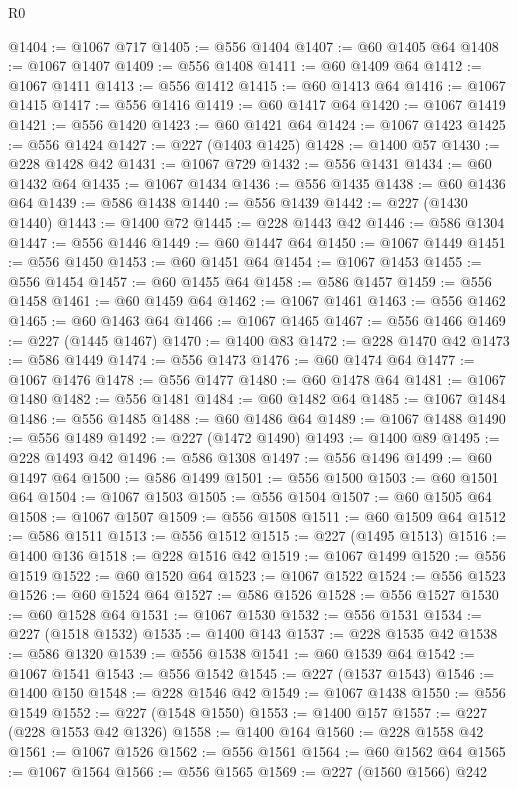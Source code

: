 \begin{lexlean}{R0}
\begin{coremodule}
@1404 := @1067 @717
@1405 := @556 @1404
@1407 := @60 @1405 @64
@1408 := @1067 @1407
@1409 := @556 @1408
@1411 := @60 @1409 @64
@1412 := @1067 @1411
@1413 := @556 @1412
@1415 := @60 @1413 @64
@1416 := @1067 @1415
@1417 := @556 @1416
@1419 := @60 @1417 @64
@1420 := @1067 @1419
@1421 := @556 @1420
@1423 := @60 @1421 @64
@1424 := @1067 @1423
@1425 := @556 @1424
@1427 := @227 (@1403 @1425)
@1428 := @1400 @57
@1430 := @228 @1428 @42
@1431 := @1067 @729
@1432 := @556 @1431
@1434 := @60 @1432 @64
@1435 := @1067 @1434
@1436 := @556 @1435
@1438 := @60 @1436 @64
@1439 := @586 @1438
@1440 := @556 @1439
@1442 := @227 (@1430 @1440)
@1443 := @1400 @72
@1445 := @228 @1443 @42
@1446 := @586 @1304
@1447 := @556 @1446
@1449 := @60 @1447 @64
@1450 := @1067 @1449
@1451 := @556 @1450
@1453 := @60 @1451 @64
@1454 := @1067 @1453
@1455 := @556 @1454
@1457 := @60 @1455 @64
@1458 := @586 @1457
@1459 := @556 @1458
@1461 := @60 @1459 @64
@1462 := @1067 @1461
@1463 := @556 @1462
@1465 := @60 @1463 @64
@1466 := @1067 @1465
@1467 := @556 @1466
@1469 := @227 (@1445 @1467)
@1470 := @1400 @83
@1472 := @228 @1470 @42
@1473 := @586 @1449
@1474 := @556 @1473
@1476 := @60 @1474 @64
@1477 := @1067 @1476
@1478 := @556 @1477
@1480 := @60 @1478 @64
@1481 := @1067 @1480
@1482 := @556 @1481
@1484 := @60 @1482 @64
@1485 := @1067 @1484
@1486 := @556 @1485
@1488 := @60 @1486 @64
@1489 := @1067 @1488
@1490 := @556 @1489
@1492 := @227 (@1472 @1490)
@1493 := @1400 @89
@1495 := @228 @1493 @42
@1496 := @586 @1308
@1497 := @556 @1496
@1499 := @60 @1497 @64
@1500 := @586 @1499
@1501 := @556 @1500
@1503 := @60 @1501 @64
@1504 := @1067 @1503
@1505 := @556 @1504
@1507 := @60 @1505 @64
@1508 := @1067 @1507
@1509 := @556 @1508
@1511 := @60 @1509 @64
@1512 := @586 @1511
@1513 := @556 @1512
@1515 := @227 (@1495 @1513)
@1516 := @1400 @136
@1518 := @228 @1516 @42
@1519 := @1067 @1499
@1520 := @556 @1519
@1522 := @60 @1520 @64
@1523 := @1067 @1522
@1524 := @556 @1523
@1526 := @60 @1524 @64
@1527 := @586 @1526
@1528 := @556 @1527
@1530 := @60 @1528 @64
@1531 := @1067 @1530
@1532 := @556 @1531
@1534 := @227 (@1518 @1532)
@1535 := @1400 @143
@1537 := @228 @1535 @42
@1538 := @586 @1320
@1539 := @556 @1538
@1541 := @60 @1539 @64
@1542 := @1067 @1541
@1543 := @556 @1542
@1545 := @227 (@1537 @1543)
@1546 := @1400 @150
@1548 := @228 @1546 @42
@1549 := @1067 @1438
@1550 := @556 @1549
@1552 := @227 (@1548 @1550)
@1553 := @1400 @157
@1557 := @227 (@228 @1553 @42 @1326)
@1558 := @1400 @164
@1560 := @228 @1558 @42
@1561 := @1067 @1526
@1562 := @556 @1561
@1564 := @60 @1562 @64
@1565 := @1067 @1564
@1566 := @556 @1565
@1569 := @227 (@1560 @1566) @242

\end{coremodule}
\end{lexlean}
